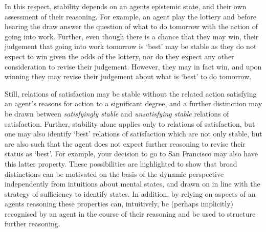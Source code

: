 \documentclass[10pt]{article}
\begin{document}
In this respect, stability depends on an agents epistemic state, and their own assessment of their reasoning.
For example, an agent play the lottery and before hearing the draw answer the question of what to do tomorrow with the action of going into work.
Further, even though there is a chance that they may win, their judgement that going into work tomorrow is `best' may be stable as they do not expect to win given the odds of the lottery, nor do they expect any other consideration to revise their judgement.
However, they may in fact win, and upon winning they may revise their judgement about what is `best' to do tomorrow.

Still, relations of satisfaction may be stable without the related action satisfying an agent's reasons for action to a significant degree, and a further distinction may be drawn between \emph{satisfyingly stable} and \emph{unsatisfying stable} relations of satisfaction.
Further, stability alone applies only to relations of satisfaction, but one may also identify `best' relations of satisfaction which are not only stable, but are also such that the agent does not expect further reasoning to revise their status as `best'.
For example, your decision to go to San Francisco may also have this latter property.
These possibilities are highlighted to show that broad distinctions can be motivated on the basis of the dynamic perspective independently from intuitions about mental states, and drawn on in line with the strategy of sufficiency to identify states.
In addition, by relying on aspects of an agents reasoning these properties can, intuitively, be (perhaps implicitly) recognised by an agent in the course of their reasoning and be used to structure further reasoning.
\end{document}
